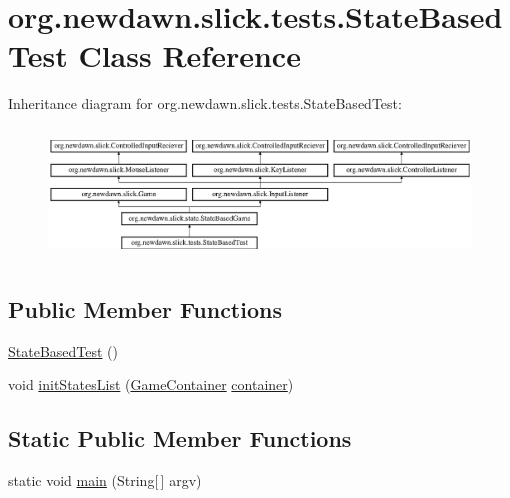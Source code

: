 \hypertarget{classorg_1_1newdawn_1_1slick_1_1tests_1_1_state_based_test}{}\section{org.\+newdawn.\+slick.\+tests.\+State\+Based\+Test Class Reference}
\label{classorg_1_1newdawn_1_1slick_1_1tests_1_1_state_based_test}
Inheritance diagram for org.\+newdawn.\+slick.\+tests.\+State\+Based\+Test\+:\begin{figure}[H]
\begin{center}
\leavevmode
\includegraphics[height=3.522012cm]{classorg_1_1newdawn_1_1slick_1_1tests_1_1_state_based_test}
\end{center}
\end{figure}
\subsection*{Public Member Functions}
\begin{DoxyCompactItemize}
\item 
\mbox{\hyperlink{classorg_1_1newdawn_1_1slick_1_1tests_1_1_state_based_test_adda4a4dfe7070c4b4cea79dd83158757}{State\+Based\+Test}} ()
\item 
void \mbox{\hyperlink{classorg_1_1newdawn_1_1slick_1_1tests_1_1_state_based_test_a4b73ca3cda0cffc582a2527bd983d5dc}{init\+States\+List}} (\mbox{\hyperlink{classorg_1_1newdawn_1_1slick_1_1_game_container}{Game\+Container}} \mbox{\hyperlink{classorg_1_1newdawn_1_1slick_1_1state_1_1_state_based_game_a538846600436175cbed48450adfdd025}{container}})
\end{DoxyCompactItemize}
\subsection*{Static Public Member Functions}
\begin{DoxyCompactItemize}
\item 
static void \mbox{\hyperlink{classorg_1_1newdawn_1_1slick_1_1tests_1_1_state_based_test_a7a7ee9e069ada40fb4fadc2e36cd1d9f}{main}} (String\mbox{[}$\,$\mbox{]} argv)
\end{DoxyCompactItemize}
